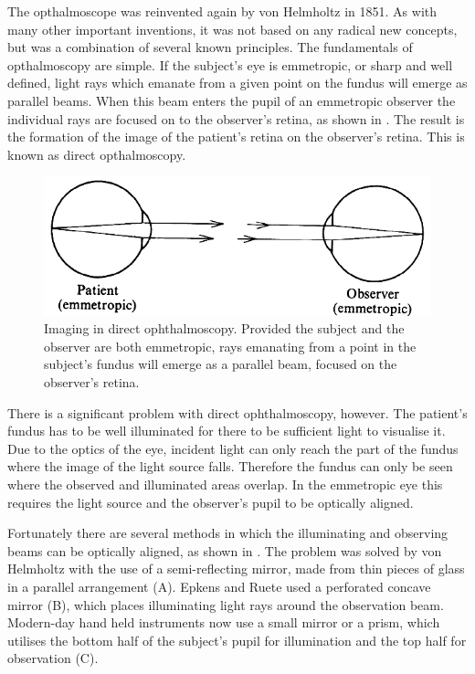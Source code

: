 The opthalmoscope was reinvented again by von Helmholtz in 1851.  As with many other important inventions, it was not based on any radical new concepts, but was a combination of several known principles.  The fundamentals of opthalmoscopy are simple.  If the subject's eye is emmetropic, or sharp and well defined, light rays which emanate from a given point on the fundus will emerge as parallel beams.  When this beam enters the pupil of an emmetropic observer the individual rays are focused on to the observer's retina, as shown in .  The result is the formation of the image of the patient's retina on the observer's retina.  This is known as direct opthalmoscopy.

\begin{figure}[htbp]
\centering
  \includegraphics{figures/direct_opthalmoscopy}
\caption{Imaging in direct ophthalmoscopy. Provided the subject and the observer are both emmetropic, rays emanating from a point in the subject's fundus will emerge as a parallel beam, focused on the observer's retina.\cite{colenbrander2013principles}}
\label{fig:direct_opthal}
\end{figure}

There is a significant problem with direct ophthalmoscopy, however.  The patient's fundus has to be well illuminated for there to be sufficient light to visualise it.  Due to the optics of the eye, incident light can only reach the part of the fundus where the image of the light source falls.  Therefore the fundus can only be seen where the observed and illuminated areas overlap.  In the emmetropic eye this requires the light source and the observer's pupil to be optically aligned.

Fortunately there are several methods in which the illuminating and observing beams can be optically aligned, as shown in .  The problem was solved by von Helmholtz with the use of a semi-reflecting mirror, made from thin pieces of glass in a parallel arrangement (A). Epkens and Ruete used a perforated concave mirror (B), which places illuminating light rays around the observation beam.  Modern-day hand held instruments now use a small mirror or a prism, which utilises the bottom half of the subject's pupil for illumination and the top half for observation (C).

